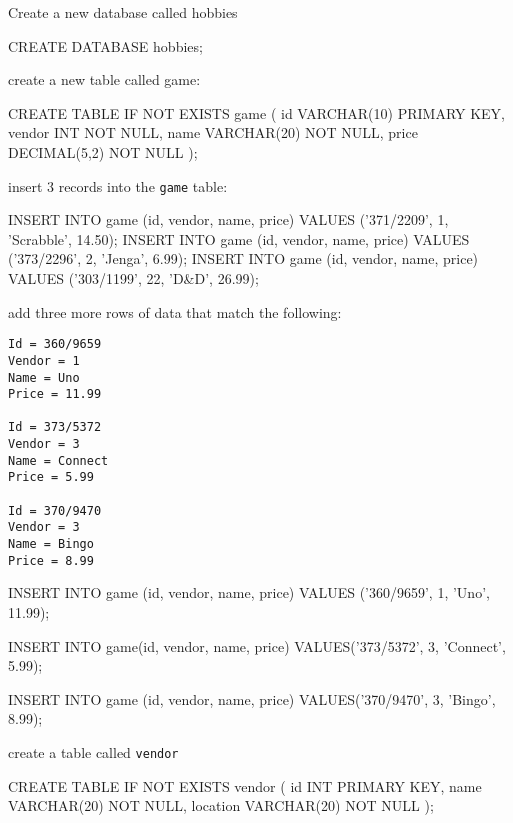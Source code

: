 
Create a new database called hobbies
\begin{sql}
CREATE DATABASE hobbies;
\end{sql}

create a new table called game:
\begin{sql}
CREATE TABLE IF NOT EXISTS game ( 
  id     VARCHAR(10)  PRIMARY KEY,
  vendor INT          NOT NULL,
  name   VARCHAR(20)     NOT NULL,
  price  DECIMAL(5,2) NOT NULL
);
\end{sql}

insert 3 records into the \verb|game| table:
\begin{sql}
INSERT INTO game (id, vendor, name, price)
   VALUES ('371/2209', 1, 'Scrabble', 14.50);
INSERT INTO game (id, vendor, name, price)
   VALUES ('373/2296', 2, 'Jenga', 6.99);
INSERT INTO game (id, vendor, name, price)
   VALUES ('303/1199', 22, 'D&D', 26.99);
\end{sql}

add three more rows of data that match the following:
\begin{verbatim}
Id = 360/9659
Vendor = 1
Name = Uno
Price = 11.99

Id = 373/5372
Vendor = 3
Name = Connect
Price = 5.99

Id = 370/9470
Vendor = 3
Name = Bingo
Price = 8.99
\end{verbatim}

\begin{sql}
INSERT INTO game (id, vendor, name, price)
VALUES ('360/9659', 1, 'Uno', 11.99);

INSERT INTO game(id, vendor, name, price)
VALUES('373/5372', 3, 'Connect', 5.99);

INSERT INTO game (id, vendor, name, price)
VALUES('370/9470', 3, 'Bingo', 8.99);
\end{sql}

create a table called \verb|vendor|
\begin{sql}
CREATE TABLE IF NOT EXISTS vendor (
  id       INT      PRIMARY KEY,
  name     VARCHAR(20) NOT NULL,
  location VARCHAR(20) NOT NULL
);
\end{sql}

